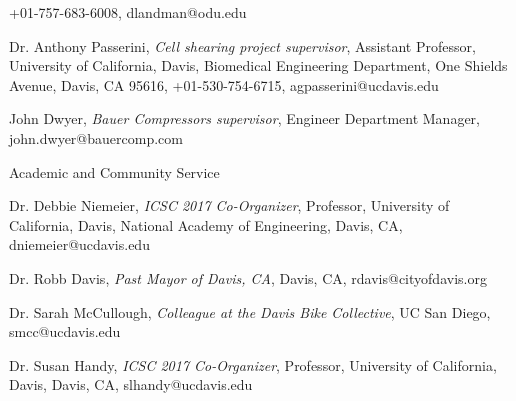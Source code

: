 \documentclass[10pt]{article}
\newenvironment{outerlist}[1][\enskip\textbullet]%
        {\begin{itemize}[#1]}{\end{itemize}%
         \vspace{-.6\baselineskip}}
\newenvironment{innerlist}[1][\enskip\textbullet]%
        {\begin{compactitem}[#1]}{\end{compactitem}}
\begin{document}
\begin{outerlist}
\begin{innerlist}
        +01-757-683-6008,
        dlandman@odu.edu
      \item Dr. Anthony Passerini,
        \emph{Cell shearing project supervisor},
        Assistant Professor,
        University of California, Davis,
        Biomedical Engineering Department,
        One Shields Avenue, Davis, CA 95616,
        +01-530-754-6715,
        agpasserini@ucdavis.edu
      \item John Dwyer,
        \emph{Bauer Compressors supervisor},
        Engineer Department Manager,
        john.dwyer@bauercomp.com
    \end{innerlist}
  \item[] Academic and Community Service
    \begin{innerlist}
      \item Dr. Debbie Niemeier,
        \emph{ICSC 2017 Co-Organizer},
        Professor,
        University of California, Davis,
        National Academy of Engineering,
        Davis, CA,
        dniemeier@ucdavis.edu
      \item Dr. Robb Davis,
        \emph{Past Mayor of Davis, CA},
        Davis, CA,
        rdavis@cityofdavis.org
      \item Dr. Sarah McCullough,
        \emph{Colleague at the Davis Bike Collective},
        UC San Diego,
        smcc@ucdavis.edu
      \item Dr. Susan Handy,
        \emph{ICSC 2017 Co-Organizer},
        Professor,
        University of California, Davis,
        Davis, CA,
        slhandy@ucdavis.edu
    \end{innerlist}
\end{outerlist}
%
\end{document}
